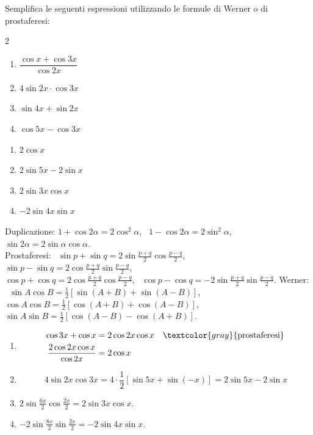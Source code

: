 
\begin{question}[ID=3.1, subtitle={Formule di Werner e prostaferesi — serie 1}, tags={goniometria, prostaferesi, Werner}, difficulty=media]
Semplifica le seguenti espressioni utilizzando le formule di Werner o di prostaferesi:
\begin{multicols}{2}
\begin{enumerate}
\item $\dfrac{\cos x + \cos 3x}{\cos 2x}$
\item $4 \sin 2x \cdot \cos 3x$
\item $\sin 4x + \sin 2x$
\item $\cos 5x - \cos 3x$
\end{enumerate}
\end{multicols}
\begin{solution}
\begin{enumerate}
    \item $2\cos x$
    \item $2\sin5x-2\sin x$
    \item $2\sin3x\cos x$
    \item $-2\sin4x\sin x$
\end{enumerate}
\end{solution}
\begin{explanation}
Duplicazione: $1+\cos2\alpha=2\cos^2\alpha$, \ $1-\cos2\alpha=2\sin^2\alpha$, \ $\sin2\alpha=2\sin\alpha\cos\alpha$. \\
Prostaferesi: \ $\sin p+\sin q=2\sin\tfrac{p+q}{2}\cos\tfrac{p-q}{2}$, \ $\sin p-\sin q=2\cos\tfrac{p+q}{2}\sin\tfrac{p-q}{2}$, \\
$\cos p+\cos q=2\cos\tfrac{p+q}{2}\cos\tfrac{p-q}{2}$, \ $\cos p-\cos q=-2\sin\tfrac{p+q}{2}\sin\tfrac{p-q}{2}$.
Werner: \ $\sin A\cos B=\tfrac12[\sin(A+B)+\sin(A-B)]$, \ $\cos A\cos B=\tfrac12[\cos(A+B)+\cos(A-B)]$, \ $\sin A\sin B=\tfrac12[\cos(A-B)-\cos(A+B)]$.
\begin{enumerate}
    \item \[\begin{aligned}
    \cos3x+\cos x &= 2\cos2x\cos x && \textcolor{gray}{\text{prostaferesi}}\\
    \dfrac{2\cos2x\cos x}{\cos2x} &= 2\cos x
    \end{aligned}\]
    \item \[ 4\sin2x\cos3x=4\cdot\dfrac12\left[\sin5x+\sin(-x)\right]=2\sin5x-2\sin x \]
    \item $2\sin\tfrac{6x}{2}\cos\tfrac{2x}{2}=2\sin3x\cos x$.
    \item $-2\sin\tfrac{8x}{2}\sin\tfrac{2x}{2}=-2\sin4x\sin x$.
\end{enumerate}
\end{explanation}
\end{question}

